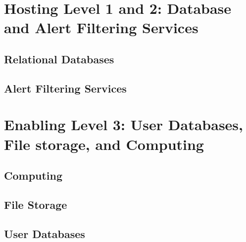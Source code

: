 \documentclass[DM,lsstdraft,toc]{lsstdoc}
\begin{document}
\section{Hosting Level 1 and 2: Database and Alert Filtering Services}

\subsection{Relational Databases}

\subsection{Alert Filtering Services}

\section{Enabling Level 3: User Databases, File storage, and Computing}

\subsection{Computing}

\subsection{File Storage}

\subsection{User Databases}
\end{document}
